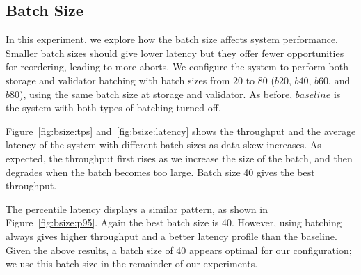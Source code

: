 \subsection{Batch Size}
In this experiment, we explore how the batch size affects system performance. 
Smaller batch sizes should give lower latency but they offer fewer opportunities for reordering, leading to more aborts. 
We configure the system to perform both storage and validator batching with batch sizes from $20$ to $80$ ($b20$, $b40$, $b60$, and $b80$), using the same batch size at storage and validator. As before, $baseline$ is the system with both types of batching turned off. 

Figure~\ref{fig:bsize:tps} and~\ref{fig:bsize:latency} shows the throughput and the average latency of the system with different batch sizes as data skew increases. As expected, the throughput first rises as we increase the size of the batch, and then degrades when the batch becomes too large. Batch size 40 gives the best throughput.

The percentile latency displays a similar pattern, as shown in Figure~\ref{fig:bsize:p95}. Again the best batch size is 40. However, using batching always gives higher throughput and a better latency profile than the baseline. Given the above results, a batch size of 40 appears optimal for our configuration; we use this batch size in the remainder of our experiments. 